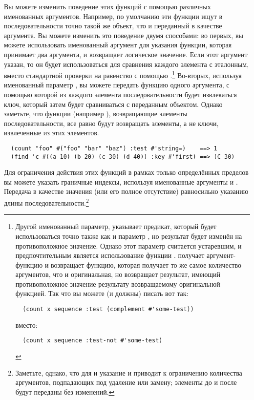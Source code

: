 Вы можете изменить поведение этих функций с помощью различных именованных аргументов.
Например, по умолчанию эти функции ищут в последовательности точно такой же объект, что и
переданный в качестве аргумента.  Вы можете изменить это поведение двумя способами: во
первых, вы можете использовать именованный аргумент  для указания функции,
которая принимает два аргумента, и возвращает логическое значение.  Если этот аргумент
указан, то он будет использоваться для сравнения каждого элемента с эталонным, вместо стандартной
проверки на равенство с помощью .\footnote{Другой именованный параметр,
   указывает предикат, который будет использоваться точно также как и
  параметр , но результат будет изменён на
  противоположное значение.  Однако этот параметр считается устаревшим, и предпочтительным
  является использование функции .   получает
  аргумент-функцию и возвращает функцию, которая получает то же самое количество
  аргументов, что и оригинальная, но возвращает результат, имеющий противоположное
  значение результату возвращаемому оригинальной функцией.  Так что вы можете (и должны)
  писать вот так:

\begin{verbatim}
  (count x sequence :test (complement #'some-test))
\end{verbatim}

вместо:

\begin{verbatim}
  (count x sequence :test-not #'some-test)
\end{verbatim}

} Во-вторых, используя именованный параметр , вы можете передать функцию одного
аргумента, с помощью которой из каждого элемента последовательности будет извлекаться ключ,
который затем будет сравниваться с переданным объектом.  Однако заметьте, что
функции (например ), возвращающие элементы последовательности, все равно будут
возвращать элементы, а не ключи, извлеченные из этих элементов.

\begin{verbatim}
  (count "foo" #("foo" "bar" "baz") :test #'string=)    ==> 1
  (find 'c #((a 10) (b 20) (c 30) (d 40)) :key #'first) ==> (C 30)
\end{verbatim}

Для ограничения действия этих функций в рамках только определённых пределов вы можете
указать граничные индексы, используя именованные аргументы  и .
Передача  в качестве значения  (или его полное отсутствие)
равносильно указанию длины последовательности.\footnote{Заметьте, однако, что для
   и  указание  и  приводит к
  ограничению количества аргументов, подпадающих под удаление или замену; элементы до
   и после  будут переданы без изменений.}

